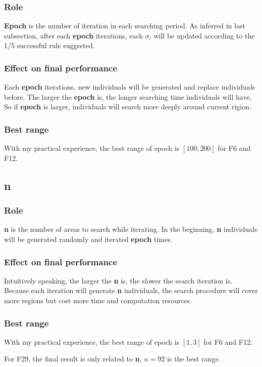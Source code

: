 \documentclass[lang=en,12pt]{elegantpaper}
\begin{document}
\subsubsection{Role}
\textbf{Epoch} is the number of iteration in each searching period.
As inferred in last subsection, after each \textbf{epoch} iterations, each $\sigma_i$ will be updated according to the 1/5 successful rule suggested.
\subsubsection{Effect on final performance}
Each \textbf{epoch} iterations, new individuals will be generated and replace individuals before.
The larger the \textbf{epoch} is, the longer searching time individuals will have.
So if \textbf{epoch} is larger, individuals will search more deeply around current rigion.
\subsubsection{Best range}
With my practical experience, the best range of epoch is $[100, 200]$ for F6 and F12.



\subsection{n}
\subsubsection{Role}
\textbf{n} is the number of areas to search while iterating.
In the beginning, \textbf{n} individuals will be generated randomly and iterated \textbf{epoch} times.
\subsubsection{Effect on final performance}
Intuitively speaking, the larger the \textbf{n} is, the slower the search iteration is.
Because each iteration will generate \textbf{n} individuals, the search procedure will cover more regions but cost more time and computation resources.
\subsubsection{Best range}
With my practical experience, the best range of epoch is $[1, 3]$ for F6 and F12.

For F29, the final result is only related to \textbf{n}, $n = 92$ is the best range.
\end{document}
